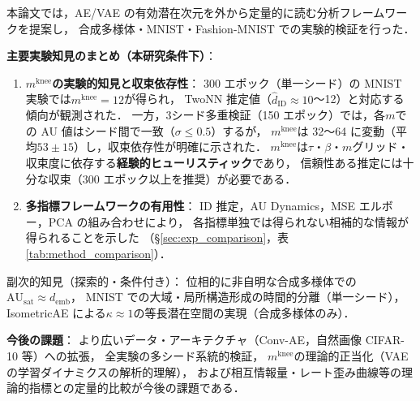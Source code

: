 \documentclass[11pt,a4paper]{jsarticle}
\newcommand{\kap}{\kappa}
\newcommand{\AUsat}{\mathrm{AU}_{\mathrm{sat}}}
\newcommand{\mknee}{m^{\mathrm{knee}}}
\newcommand{\demb}{d_{\mathrm{emb}}}
\begin{document}
本論文では，AE/VAE の有効潜在次元を外から定量的に読む分析フレームワークを提案し，
合成多様体・MNIST・Fashion-MNIST での実験的検証を行った．

\textbf{主要実験知見のまとめ（本研究条件下）}：
\begin{enumerate}
  \item \textbf{$\mknee$の実験的知見と収束依存性}：
        300 エポック（単一シード）の MNIST 実験では$\mknee = 12$が得られ，
        TwoNN 推定値（$\hat{d}_\mathrm{ID} \approx 10$〜12）と対応する傾向が観測された．
        一方，3シード多重検証（150 エポック）では，各$m$での AU 値はシード間で一致（$\sigma \leq 0.5$）するが，
        $\mknee$は 32〜64 に変動（平均$53 \pm 15$）し，収束依存性が明確に示された．
        $\mknee$は$\tau$・$\beta$・$m$グリッド・収束度に依存する\textbf{経験的ヒューリスティック}であり，
        信頼性ある推定には十分な収束（300 エポック以上を推奨）が必要である．
  \item \textbf{多指標フレームワークの有用性}：
        ID 推定，AU Dynamics，MSE エルボー，PCA の組み合わせにより，
        各指標単独では得られない相補的な情報が得られることを示した
        （§\ref{sec:exp_comparison}，表\ref{tab:method_comparison}）．
\end{enumerate}

副次的知見（探索的・条件付き）：
位相的に非自明な合成多様体での$\AUsat \approx \demb$，
MNIST での大域・局所構造形成の時間的分離（単一シード），
IsometricAE による$\kap \approx 1$の等長潜在空間の実現（合成多様体のみ）．

\textbf{今後の課題}：
より広いデータ・アーキテクチャ（Conv-AE，自然画像 CIFAR-10 等）への拡張，
全実験の多シード系統的検証，
$\mknee$の理論的正当化（VAE の学習ダイナミクスの解析的理解），
および相互情報量・レート歪み曲線等の理論的指標との定量的比較が今後の課題である．
\end{document}
